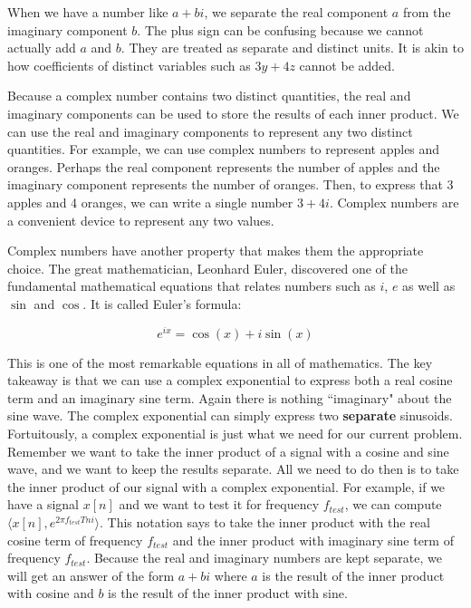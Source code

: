 When we have a number like $a + bi$, we
separate the real component $a$ from the imaginary component $b$.  The plus sign can be confusing because we cannot actually add $a$ and $b$.  They are treated
as separate and distinct units. It is akin to how coefficients of distinct variables such as $3y + 4z$ cannot be added. 

Because a complex number contains two distinct quantities, the real and imaginary components can be used
to store the results of each inner product.  We can use the real and imaginary components to represent any
two distinct quantities.  For example, we can use complex numbers to represent apples and oranges.  
Perhaps the real component represents the number of apples and the imaginary component represents
the number of oranges.  Then, to express that 3 apples and 4 oranges, we can write a single number
$3 + 4i$.  Complex numbers are a convenient device to represent any two values.

Complex numbers have another property that makes them the appropriate choice.  The great 
mathematician, Leonhard Euler, discovered one of the fundamental mathematical equations
that relates numbers such as $i$, $e$ as well as $\sin$ and $\cos$.  It is called Euler's formula:

\begin{equation}
\label{eq:euler}
e^{ix} = \cos(x) + i\sin(x)
\end{equation}

This is one of the most remarkable equations in all of mathematics.  The key takeaway is that we can use
a complex exponential to express both a real cosine term and an imaginary sine term.  Again there is
nothing ``imaginary" about the sine wave.  The complex exponential can simply express two 
\textbf{separate} sinusoids.  Fortuitously, a complex exponential is just what we need for our current
problem.  Remember we want to take the inner product of a signal with a cosine and sine wave, and we want to 
keep the results separate.  All we need to do then is to take the inner product of our signal with a complex
exponential.  For example, if we have a signal $x[n]$ and
we want to test it for frequency $f_{test}$, we can compute $\langle x[n], e^{2\pi f_{test}Tni}\rangle$.  This
notation says to take the inner product with the real cosine term of frequency $f_{test}$ and the inner
product with imaginary sine term of frequency $f_{test}$.  Because the real and imaginary numbers are kept
separate, we will get an answer of the form $a + bi$ where $a$ is the result of the inner product with cosine
and $b$ is the result of the inner product with sine. 

